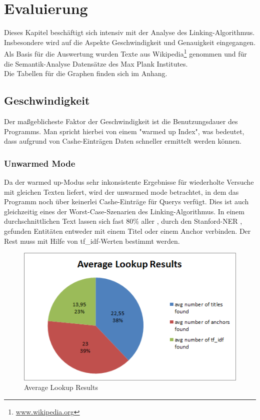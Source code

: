 \documentclass[11pt, a4paper, oneside]{Thesis} %
\begin{document}
\chapter{Evaluierung}
\label{Kapitel 4}

Dieses Kapitel besch\"aftigt sich intensiv mit der Analyse des Linking-Algorithmus. Insbesondere wird auf die Aspekte Geschwindigkeit und Genauigkeit eingegangen. Als Basis f\"ur die Auswertung wurden Texte aus Wikipedia\footnote{\url{www.wikipedia.org}} genommen und f\"ur die Semantik-Analyse Datens\"atze des Max Plank Institutes.\\
Die Tabellen f\"ur die Graphen finden sich im Anhang.

\section{Geschwindigkeit}
Der ma\ss geblicheste Faktor der Geschwindigkeit ist die Benutzungsdauer des Programms. Man spricht hierbei von einem "warmed up Index", was bedeutet, dass aufgrund von Cashe-Eintr\"agen Daten schneller ermittelt werden k\"onnen.
\subsection{Unwarmed Mode}
Da der \grqq warmed up\grqq{}-Modus sehr inkonsistente Ergebnisse f\"ur wiederholte Versuche mit gleichen Texten liefert, wird der \grqq unwarmed mode\grqq{} betrachtet, in dem das Programm noch \"uber keinerlei Cashe-Eintr\"age f\"ur Querys verf\"ugt. Dies ist auch gleichzeitig eines der Worst-Case-Szenarien des Linking-Algorithmus.\clearpage
In einem durchschnittlichen Text lassen sich fast 80\% aller , durch den Stanford-NER , gefunden Entit\"aten entweder mit einem Titel oder einem Anchor verbinden. Der Rest muss mit Hilfe von tf\_idf-Werten bestimmt werden.
\begin{figure}[ht!]
\centering
\includegraphics[scale=1]{./lookupRes.png}
\caption[Average Lookup Results]{Average Lookup Results}
\end{figure}
\end{document}
